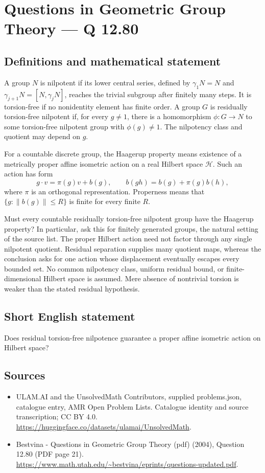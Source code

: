\documentclass[11pt,a4paper]{article}
\begin{document}
\section*{Questions in Geometric Group Theory — Q 12.80}\label{statement}

\subsection{Definitions and mathematical statement}
A group $N$ is nilpotent if its lower central series, defined by $\gamma_1N=N$ and $\gamma_{j+1}N=[N,\gamma_jN]$, reaches the trivial subgroup after finitely many steps. It is torsion-free if no nonidentity element has finite order. A group $G$ is residually torsion-free nilpotent if, for every $g\ne1$, there is a homomorphism $\phi:G\to N$ to some torsion-free nilpotent group with $\phi(g)\ne1$. The nilpotency class and quotient may depend on $g$.

For a countable discrete group, the Haagerup property means existence of a metrically proper affine isometric action on a real Hilbert space $\mathcal H$. Such an action has form
\[
 g\cdot v=\pi(g)v+b(g),\qquad
 b(gh)=b(g)+\pi(g)b(h),
\]
where $\pi$ is an orthogonal representation. Properness means that $\{g:\|b(g)\|\leq R\}$ is finite for every finite $R$.

Must every countable residually torsion-free nilpotent group have the Haagerup property? In particular, ask this for finitely generated groups, the natural setting of the source list. The proper Hilbert action need not factor through any single nilpotent quotient. Residual separation supplies many quotient maps, whereas the conclusion asks for one action whose displacement eventually escapes every bounded set. No common nilpotency class, uniform residual bound, or finite-dimensional Hilbert space is assumed. Mere absence of nontrivial torsion is weaker than the stated residual hypothesis.
\subsection{Short English statement}
Does residual torsion-free nilpotence guarantee a proper affine isometric action on Hilbert space?
\subsection{Sources}
\begin{itemize}
\item[S1] ULAM.AI and the UnsolvedMath Contributors, supplied problems.json, catalogue entry, AMR Open Problem Lists. Catalogue identity and source transcription; CC BY 4.0.
\url{https://huggingface.co/datasets/ulamai/UnsolvedMath}.
\item[S2] Bestvina - Questions in Geometric Group Theory (pdf) (2004), Question 12.80 (PDF page 21). 
\url{https://www.math.utah.edu/~bestvina/eprints/questions-updated.pdf}.
\end{itemize}
\end{document}
